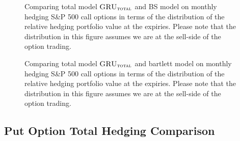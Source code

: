 \documentclass[letterpaper,12pt,titlepage,oneside,final]{book}
\numberwithin{equation}{section}
\theoremstyle{definition}
\newcommand{\modelT}{\textsc{GRU}_{\textsc{total}}}
\begin{document}
\begin{figure}[htp!]
	\caption{Comparing total model $\modelT$ and BS model  on monthly hedging S\&P 500 call options in terms of the distribution of the  relative hedging portfolio value at the expiries. Please note that the distribution in this figure assumes we are at the sell-side of the option trading.} 
	\label{fig:CallTotalM2}
		\centering
	\caption{Comparing total model $\modelT$ and bartlett model on monthly hedging S\&P 500 call options in terms of the distribution of the  relative hedging portfolio value at the expiries. Please note that the distribution in this figure assumes we are at the sell-side of the option trading.} \label{fig:CallTotalM3}
\end{figure}

\newpage
\subsection{Put Option Total Hedging Comparison}
\end{document}
